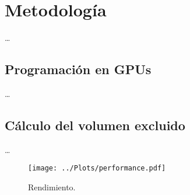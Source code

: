 \chapter{Metodología}
\label{cap:methodology}

\dots

\section{Programación en GPUs}

\cite{Wilt2013}

\dots

\section{Cálculo del volumen excluido}

\dots

\begin{figure}
  \centering
  \texttt{[image: ../Plots/performance.pdf]}
  \caption{Rendimiento.}
  \label{fig:performance}
\end{figure}
